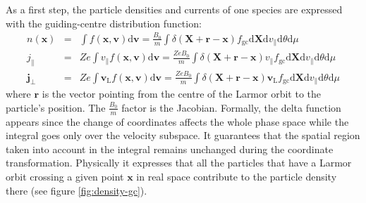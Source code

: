 \documentclass[a4paper,10pt]{article}
\newcommand{\st}[1]{\mathrm{#1}} %
\renewcommand{\vec}[1]{\mathbf{#1}}
\begin{document}
As a first step, the particle densities and currents of one species are expressed with the guiding-centre distribution function:
\begin{eqnarray}
	n(\mathbf{x}) &=& \int f(\mathbf{x},\mathbf{v}) \mathrm{d} \mathbf{v} = \frac{B_0}{m} \int \delta(\mathbf{X}+\mathbf{r}-\mathbf{x}) f_{\st{gc}} \mathrm{d}\mathbf{X} \mathrm{d}v_{\parallel} \mathrm{d} \theta \mathrm{d}\mu \label{eq:gc_n} \\
	j_{\parallel} &=& Z e \int v_{\parallel} f(\mathbf{x},\mathbf{v}) \mathrm{d} \mathbf{v}  = \frac{Z e B_0}{m} \int \delta(\mathbf{X}+\mathbf{r}-\mathbf{x}) v_{\parallel} f_{\st{gc}} \mathrm{d}\mathbf{X} \mathrm{d}v_{\parallel} \mathrm{d} \theta \mathrm{d}\mu \label{eq:gc_j_par}\\
	\mathbf{j}_{\perp} &=& Z e \int \vec{v}_{\st{L}} f(\mathbf{x},\mathbf{v}) \mathrm{d} \mathbf{v} = \frac{Z e B_0}{m} \int \delta(\mathbf{X}+\mathbf{r}-\mathbf{x}) \vec{v}_{\st{L}} f_{\st{gc}} \mathrm{d}\mathbf{X} \mathrm{d}v_{\parallel} \mathrm{d} \theta \mathrm{d}\mu \label{eq:gc_j_perp}
\end{eqnarray}
where $\vec{r}$ is the vector pointing from the centre of the Larmor orbit to the particle's position. The $\frac{B_0}{m}$ factor is the Jacobian. Formally, the delta function appears since the change of coordinates affects the whole phase space while the integral goes only over the velocity subspace. It guarantees that the spatial region taken into account in the integral remains unchanged during the coordinate transformation. Physically it expresses that all the particles that have a Larmor orbit crossing a given point $\vec{x}$ in real space contribute to the particle density there (see figure \ref{fig:density-gc}). 
\end{document}
